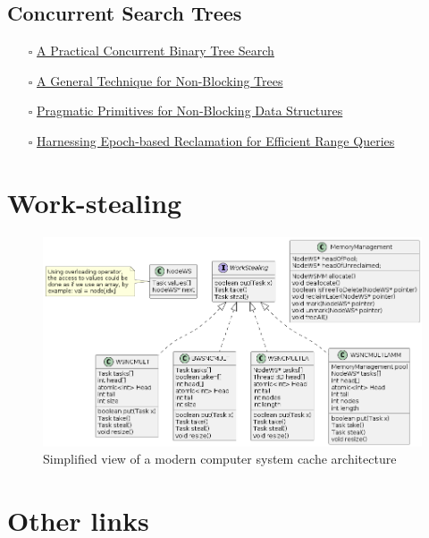\documentclass[openany, a4paper]{book}
\theoremstyle{break}
\theoremstyle{example}
\theoremstyle{note}
\theoremstyle{break}
\theoremstyle{exercise}
\begin{document}
\chapter{Concurrent Search Trees}
\label{sec:org38456a4}

\begin{itemize}
\item[{$\square$}] \href{http://ppl.stanford.edu/papers/ppopp207-bronson.pdf}{A Practical Concurrent Binary Tree Search}
\item[{$\square$}] \href{https://arxiv.org/abs/1712.06687}{A General Technique for Non-Blocking Trees}
\item[{$\square$}] \href{https://arxiv.org/abs/1712.06688}{Pragmatic Primitives for Non-Blocking Data Structures}
\item[{$\square$}] \href{http://www.cs.toronto.edu/\~tabrown/ebrrq/paper.ppopp18.pdf}{Harnessing Epoch-based Reclamation for Efficient Range Queries}
\end{itemize}

\part{Work-stealing}
\label{sec:org7b255bb}

\begin{figure}
\begin{minipage}{\linewidth}
  \includegraphics[width=\linewidth]{figs/objects.png}
\end{minipage}
\caption{Simplified view of a modern computer system cache architecture}
\label{fig:arch}
\end{figure}

\part{Other links}
\label{sec:orgfbb4291}
\end{document}
